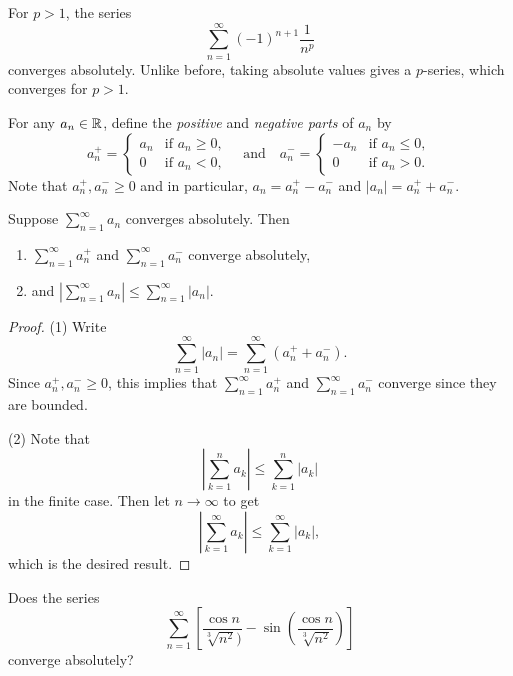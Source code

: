 \begin{example}
  For $p > 1$, the series
  \[
    \sum_{n = 1}^\infty (-1)^{n + 1} \frac{1}{n^p}
  \]
  converges absolutely. Unlike before, taking absolute
  values gives a $p$-series, which converges for $p > 1$.
\end{example}

\begin{definition}
  For any $a_n \in \mathbb{R}$, define the \emph{positive} and
  \emph{negative parts} of $a_n$ by
  \[
    a_n^+ =
    \begin{cases}
      a_n & \text{if } a_n \ge 0, \\
      0 & \text{if } a_n < 0,
    \end{cases}
    \quad \text{and} \quad
    a_n^- =
    \begin{cases}
      -a_n & \text{if } a_n \le 0, \\
      0 & \text{if } a_n > 0.
    \end{cases}
  \]
  Note that $a_n^+, a_n^- \ge 0$ and
  in particular, $a_n = a_n^+ - a_n^-$ and
  $|a_n| = a_n^+ + a_n^-$.
\end{definition}

\begin{theorem}
  Suppose $\sum_{n = 1}^\infty a_n$ converges absolutely.
  Then
  \begin{enumerate}
    \item $\sum_{n = 1}^\infty a_n^+$ and
    $\sum_{n = 1}^\infty a_n^-$ converge absolutely,
  \item and $\left|\sum_{n = 1}^\infty a_n\right| \le \sum_{n = 1}^\infty |a_n|$.
  \end{enumerate}
\end{theorem}

\begin{proof}
  (1) Write
  \[
    \sum_{n = 1}^\infty |a_n|
    = \sum_{n = 1}^\infty (a_n^+ + a_n^-).
  \]
  Since $a_n^+, a_n^- \ge 0$, this implies that
  $\sum_{n = 1}^\infty a_n^+$ and
  $\sum_{n = 1}^\infty a_n^-$ converge since they
  are bounded.

  (2) Note that
  \[
    \left|\sum_{k = 1}^n a_k\right|
    \le \sum_{k = 1}^n |a_k|
  \]
  in the finite case. Then let $n \to \infty$
  to get
  \[
    \left|\sum_{k = 1}^\infty a_k\right|
    \le \sum_{k = 1}^\infty |a_k|,
  \]
  which is the desired result.
\end{proof}

\begin{example}
  Does the series
  \[
    \sum_{n = 1}^\infty
    \left[\frac{\cos n}{\sqrt[3]{n^2})} - \sin\left(\frac{\cos n}{\sqrt[3]{n^2}}\right)\right]
  \]
  converge absolutely?
\end{example}

